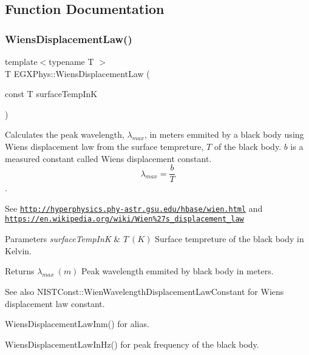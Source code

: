 \subsection{Function Documentation}
\mbox{\label{group___e_g_x_phys-_electrodynamics-_black_body-_wiens_displacement_law_ga8f89ce1baac45a1717f604255d04af44}} 
\subsubsection{\texorpdfstring{Wiens\+Displacement\+Law()}{WiensDisplacementLaw()}}
{\footnotesize\ttfamily template$<$typename T $>$ \\
T E\+G\+X\+Phys\+::\+Wiens\+Displacement\+Law (\begin{DoxyParamCaption}\item[{const T}]{surface\+Temp\+InK }\end{DoxyParamCaption})}



Calculates the peak wavelength, $\lambda_{max}$, in meters emmited by a black body using Wien\textquotesingle{}s displacement law from the surface tempreture, $T$ of the black body. $b$ is a measured constant called Wien\textquotesingle{}s displacement constant. \[\lambda_{max} = \dfrac{b}{T} \]. 

See \href{http://hyperphysics.phy-astr.gsu.edu/hbase/wien.html}{\tt http\+://hyperphysics.\+phy-\/astr.\+gsu.\+edu/hbase/wien.\+html} and \href{https://en.wikipedia.org/wiki/Wien%27s_displacement_law}{\tt https\+://en.\+wikipedia.\+org/wiki/\+Wien\%27s\+\_\+displacement\+\_\+law}


\begin{DoxyParams}{Parameters}
{\em surface\+Temp\+InK} & $T\ (K)$ Surface tempreture of the black body in Kelvin. \\
\hline
\end{DoxyParams}
\begin{DoxyReturn}{Returns}
$\lambda_{max}\ (m)$ Peak wavelength emmited by black body in meters. 
\end{DoxyReturn}
\begin{DoxySeeAlso}{See also}
N\+I\+S\+T\+Const\+::\+Wien\+Wavelength\+Displacement\+Law\+Constant for Wien\textquotesingle{}s displacement law constant. 

Wiens\+Displacement\+Law\+Inm() for alias. 

Wiens\+Displacement\+Law\+In\+Hz() for peak frequency of the black body. 
\end{DoxySeeAlso}
